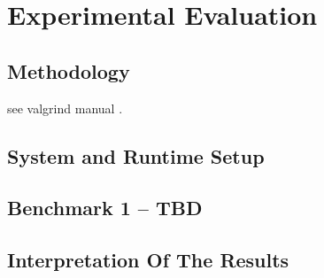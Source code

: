 \chapter{Experimental Evaluation}

\section{Methodology}

see valgrind manual \cite{valgrind}.

\section{System and Runtime Setup}

\section{Benchmark 1 -- TBD}

\section{Interpretation Of The Results}
